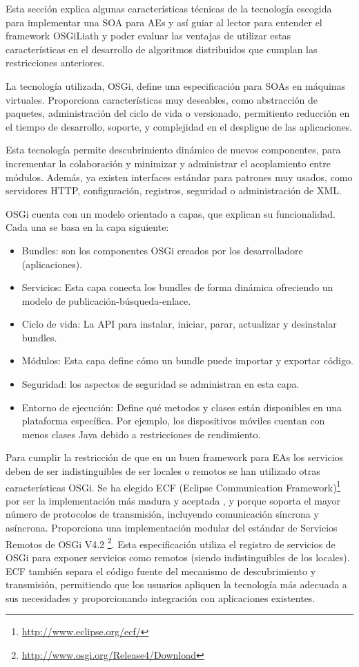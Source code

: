 \documentclass[runningheads]{llncs}
\begin{document}
Esta sección explica algunas características técnicas de la tecnología escogida para implementar una SOA para AEs y así guiar al lector para entender el framework OSGiLiath y poder evaluar las ventajas de utilizar estas características en el desarrollo de algoritmos distribuidos que cumplan las restricciones anteriores.

La tecnología utilizada, OSGi, define una especificación para SOAs en máquinas virtuales. Proporciona características muy deseables, como abstracción de paquetes, administración del ciclo de vida o versionado, permitiento reducción en el tiempo de desarrollo, soporte, y complejidad en el despligue de las aplicaciones.

Esta tecnología permite descubrimiento dinámico de nuevos componentes, para incrementar la colaboración y minimizar y administrar el acoplamiento entre módulos. Además, ya existen interfaces estándar para patrones muy usados, como servidores HTTP, configuración, registros, seguridad o administración de XML.

OSGi cuenta con un modelo orientado a capas, que explican su funcionalidad. Cada una se basa en la capa siguiente:

\begin{itemize}
\item Bundles: son los componentes OSGi creados por los desarrolladore
  (aplicaciones). %
\item Servicios: Esta capa conecta los bundles de forma dinámica ofreciendo un modelo de publicación-búsqueda-enlace.
\item Ciclo de vida: La API para instalar, iniciar, parar, actualizar y desinstalar bundles.
\item Módulos: Esta capa define cómo un bundle puede importar y exportar código.
\item Seguridad: los aspectos de seguridad se administran en esta capa.
\item Entorno de ejecución: Define qué metodos y clases están disponibles en una plataforma específica. Por ejemplo, los dispositivos móviles cuentan con menos clases Java debido a restricciones de rendimiento.
\end{itemize}

Para cumplir la restricción de que en un buen framework para EAs los servicios deben de ser indistinguibles de ser locales o remotos se han utilizado otras características OSGi.  Se ha elegido ECF (Eclipse Communication Framework)\footnote{\url{http://www.eclipse.org/ecf/}} por ser la implementación más madura y aceptada \cite{petzold2011dynamic}, y porque soporta el mayor número de protocolos de transmisión, incluyendo comunicación síncrona y asíncrona. Proporciona una implementación modular del estándar de Servicios Remotos de OSGi V4.2 \footnote{\url{http://www.osgi.org/Release4/Download}}. Esta especificación utiliza el registro de servicios de OSGi para exponer servicios como remotos (siendo indistinguibles de los locales). ECF también separa el código fuente del mecanismo de descubrimiento y transmisión, permitiendo que los usuarios apliquen la tecnología más adecuada a sus necesidades y proporcionando integración con aplicaciones existentes.
\end{document}

